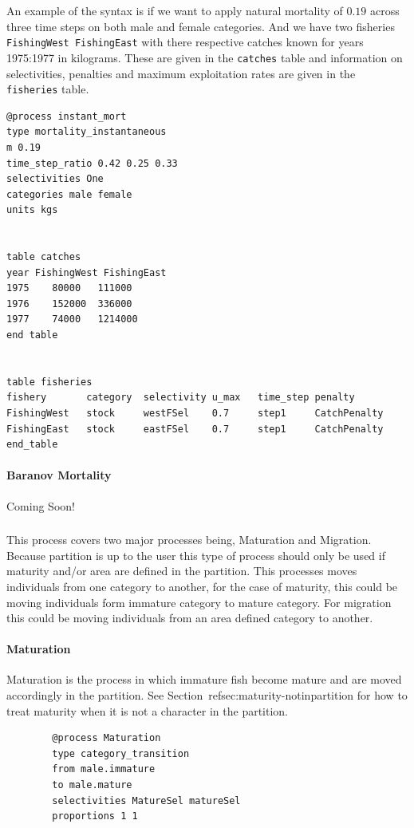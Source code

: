 An example of the syntax is if we want to apply natural mortality of $0.19$ across three time steps on both male and female categories. And we have two fisheries \texttt{FishingWest FishingEast} with there respective catches known for years 1975:1977 in kilograms. These are given in the \texttt{catches} table and information on selectivities, penalties and maximum exploitation rates are given in the \texttt{fisheries} table.
{\small{\begin{verbatim}
@process instant_mort
type mortality_instantaneous
m 0.19
time_step_ratio 0.42 0.25 0.33
selectivities One
categories male female
units kgs


table catches
year FishingWest FishingEast
1975	80000	111000
1976	152000	336000
1977	74000	1214000
end table


table fisheries
fishery       category  selectivity u_max   time_step penalty
FishingWest   stock     westFSel    0.7     step1     CatchPenalty
FishingEast   stock     eastFSel    0.7     step1     CatchPenalty
end_table
\end{verbatim}}}

\paragraph{Baranov Mortality}
Coming Soon!

\subsubsection{}
This process covers two major processes being, Maturation and Migration. Because \CNAME partition is up to the user this type of process should only be used if maturity and/or area are defined in the partition. This processes moves individuals from one category to another, for the case of maturity, this could be moving individuals form immature category to mature category. For migration this could be moving individuals from an area defined category to another.

\paragraph{Maturation}
Maturation is the process in which immature fish become mature and are moved accordingly in the partition. See Section~ref{sec:maturity-notinpartition} for how to treat maturity when it is not a character in the partition.


{\small{\begin{verbatim}
		@process Maturation
		type category_transition 
		from male.immature	
		to male.mature	
		selectivities MatureSel matureSel
		proportions 1 1
		\end{verbatim}}}


